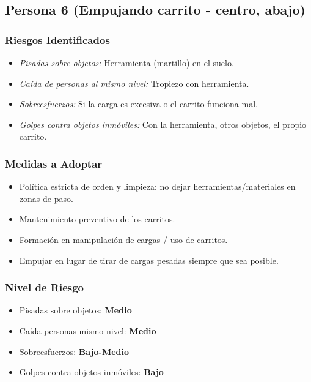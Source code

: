 \documentclass[12pt,a4paper]{article}
\begin{document}
	\bigskip\hrulefill\bigskip
	
	\subsection{Persona 6 (Empujando carrito - centro, abajo)}
	
	\subsubsection{Riesgos Identificados}
	\begin{itemize}
		\item \textit{Pisadas sobre objetos:} Herramienta (martillo) en el suelo.
		\item \textit{Caída de personas al mismo nivel:} Tropiezo con herramienta.
		\item \textit{Sobreesfuerzos:} Si la carga es excesiva o el carrito funciona mal.
		\item \textit{Golpes contra objetos inmóviles:} Con la herramienta, otros objetos, el propio carrito.
	\end{itemize}
	
	\subsubsection{Medidas a Adoptar}
	\begin{itemize}
		\item Política estricta de orden y limpieza: no dejar herramientas/materiales en zonas de paso.
		\item Mantenimiento preventivo de los carritos.
		\item Formación en manipulación de cargas / uso de carritos.
		\item Empujar en lugar de tirar de cargas pesadas siempre que sea posible.
	\end{itemize}
	
	\subsubsection{Nivel de Riesgo}
	\begin{itemize}
		\item Pisadas sobre objetos: \textbf{Medio}
		\item Caída personas mismo nivel: \textbf{Medio}
		\item Sobreesfuerzos: \textbf{Bajo-Medio}
		\item Golpes contra objetos inmóviles: \textbf{Bajo}
	\end{itemize}
	
\end{document}
